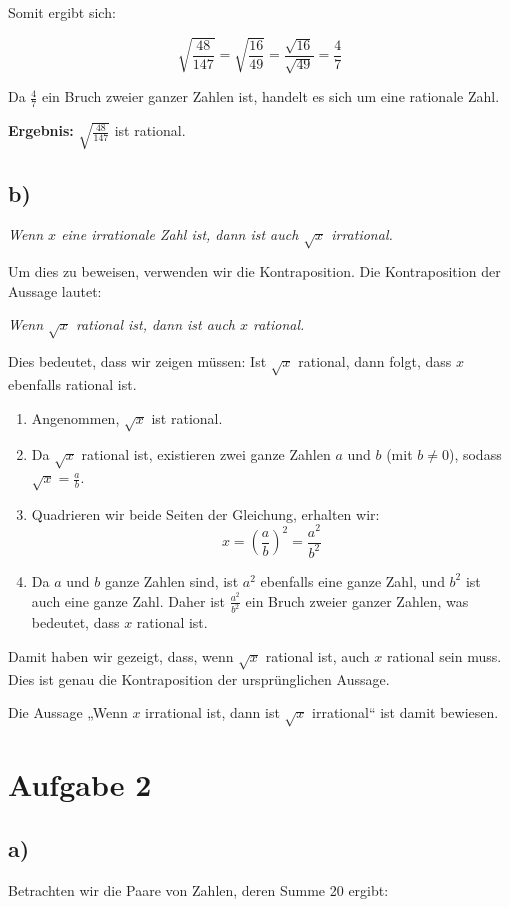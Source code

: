\documentclass[a4paper]{scrartcl}
\begin{document}
Somit ergibt sich:

\[
\sqrt{\frac{48}{147}} = \sqrt{\frac{16}{49}} = \frac{\sqrt{16}}{\sqrt{49}} = \frac{4}{7}
\]

Da \(\frac{4}{7}\) ein Bruch zweier ganzer Zahlen ist, handelt es sich um eine rationale Zahl.

\textbf{Ergebnis:} \(\sqrt{\frac{48}{147}}\) ist rational.
\subsection*{b)}
\textit{Wenn \(x\) eine irrationale Zahl ist, dann ist auch \(\sqrt{x}\) irrational.}

Um dies zu beweisen, verwenden wir die Kontraposition. Die Kontraposition der Aussage lautet:

\textit{Wenn \(\sqrt{x}\) rational ist, dann ist auch \(x\) rational.}

Dies bedeutet, dass wir zeigen müssen: Ist \(\sqrt{x}\) rational, dann folgt, dass \(x\) ebenfalls rational ist.

\begin{enumerate}
    \item Angenommen, \(\sqrt{x}\) ist rational.
    \item Da \(\sqrt{x}\) rational ist, existieren zwei ganze Zahlen \(a\) und \(b\) (mit \(b \neq 0\)), sodass \(\sqrt{x} = \frac{a}{b}\).
    \item Quadrieren wir beide Seiten der Gleichung, erhalten wir:
    \[
    x = \left( \frac{a}{b} \right)^2 = \frac{a^2}{b^2}
    \]
    \item Da \(a\) und \(b\) ganze Zahlen sind, ist \(a^2\) ebenfalls eine ganze Zahl, und \(b^2\) ist auch eine ganze Zahl. Daher ist \(\frac{a^2}{b^2}\) ein Bruch zweier ganzer Zahlen, was bedeutet, dass \(x\) rational ist.
\end{enumerate}

Damit haben wir gezeigt, dass, wenn \(\sqrt{x}\) rational ist, auch \(x\) rational sein muss. Dies ist genau die Kontraposition der ursprünglichen Aussage.

Die Aussage „Wenn \(x\) irrational ist, dann ist \(\sqrt{x}\) irrational“ ist damit bewiesen.
\section*{Aufgabe 2}
\subsection*{a)}
Betrachten wir die Paare von Zahlen, deren Summe 20 ergibt:
\end{document}
